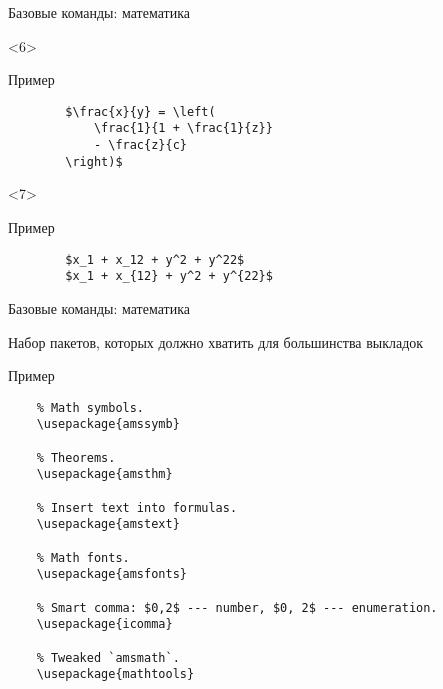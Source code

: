 \begin{frame}[fragile]{Базовые команды: математика}
\begin{onlyenv}<6>
    \begin{block}{Пример}
        \begin{lstlisting}
        $\frac{x}{y} = \left(
            \frac{1}{1 + \frac{1}{z}}
            - \frac{z}{c}
        \right)$
        \end{lstlisting}
    \end{block}
\end{onlyenv}

\begin{onlyenv}<7>
    \begin{block}{Пример}
        \begin{lstlisting}
        $x_1 + x_12 + y^2 + y^22$
        $x_1 + x_{12} + y^2 + y^{22}$
        \end{lstlisting}
    \end{block}
\end{onlyenv}

\end{frame}


\begin{frame}[fragile]{Базовые команды: математика}

Набор пакетов, которых должно хватить для большинства выкладок

\begin{block}{Пример}
    \begin{lstlisting}
    % Math symbols.
    \usepackage{amssymb}
    
    % Theorems.
    \usepackage{amsthm}
    
    % Insert text into formulas.
    \usepackage{amstext}      
    
    % Math fonts.
    \usepackage{amsfonts}
    
    % Smart comma: $0,2$ --- number, $0, 2$ --- enumeration.
    \usepackage{icomma}
    
    % Tweaked `amsmath`.
    \usepackage{mathtools}
    \end{lstlisting}
\end{block}

\end{frame}
